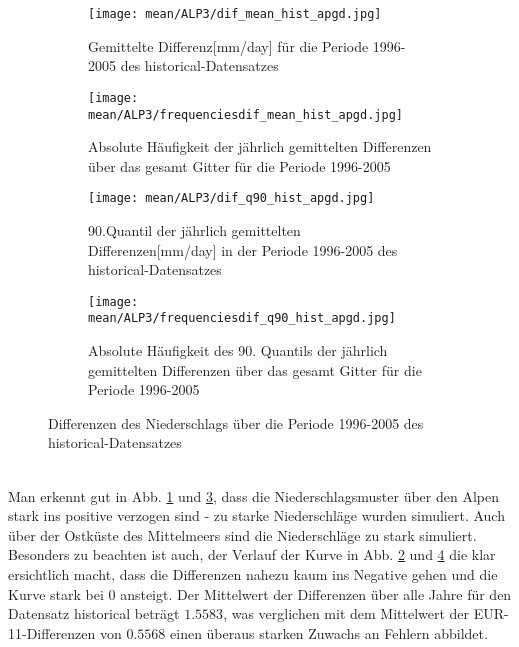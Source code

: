 \begin{figure}[hbt!]
	\begin{subfigure}{0.49\textwidth}
		\texttt{[image: mean/ALP3/dif\_mean\_hist\_apgd.jpg]}
		\caption{Gemittelte Differenz[mm/day] für die Periode 1996-2005 des historical-Datensatzes}
		\label{fig:dif_hist_apgd_mean}
	\end{subfigure}
	\begin{subfigure}{0.49\textwidth}
		\texttt{[image: mean/ALP3/frequenciesdif\_mean\_hist\_apgd.jpg]}
		\caption{Absolute Häufigkeit der jährlich gemittelten Differenzen über das gesamt Gitter für die Periode 1996-2005}
		\label{fig:freq_dif_hist_apgd_mean}
	\end{subfigure}
	\begin{subfigure}{0.49\textwidth}
		\texttt{[image: mean/ALP3/dif\_q90\_hist\_apgd.jpg]}
		\caption{90.Quantil der jährlich gemittelten Differenzen[mm/day] in der Periode 1996-2005 des historical-Datensatzes}
		\label{fig:dif_hist_apgd_q90}
	\end{subfigure}
	\begin{subfigure}{0.49\textwidth}
		\texttt{[image: mean/ALP3/frequenciesdif\_q90\_hist\_apgd.jpg]}
		\caption{Absolute Häufigkeit des 90. Quantils der jährlich gemittelten Differenzen über das gesamt Gitter für die Periode 1996-2005}
		\label{fig:freq_dif_hist_apgd_q90}
	\end{subfigure}
	\caption{Differenzen des Niederschlags über die Periode 1996-2005 des historical-Datensatzes}
	\label{fig:mean_apgd_hist}
\end{figure}
\\
Man erkennt gut in Abb. \ref{fig:dif_hist_apgd_mean} und \ref{fig:dif_hist_apgd_q90}, dass die Niederschlagsmuster über den Alpen stark ins positive verzogen sind - zu starke Niederschläge wurden simuliert. Auch über der Ostküste des Mittelmeers sind die Niederschläge zu stark simuliert. Besonders zu beachten ist auch, der Verlauf der Kurve in Abb. \ref{fig:freq_dif_hist_apgd_mean} und \ref{fig:freq_dif_hist_apgd_q90} die klar ersichtlich macht, dass die Differenzen nahezu kaum ins Negative gehen und die Kurve stark bei $0$ ansteigt. Der Mittelwert der Differenzen über alle Jahre für den Datensatz historical beträgt $1.5583$, was verglichen mit dem Mittelwert der EUR-11-Differenzen von $0.5568$ einen überaus starken Zuwachs an Fehlern abbildet.\\
